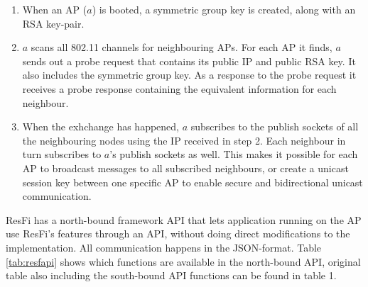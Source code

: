 \begin{enumerate}
	\item When an AP ($a$) is booted, a symmetric group key is created, along with an RSA key-pair. 
	\item $a$ scans all 802.11 channels for neighbouring APs. For each AP it finds, $a$ sends out a probe request that contains its public IP and public RSA key. It also includes
		the symmetric group key. As a response to the probe request it receives a probe response containing the equivalent information for each neighbour. 
	\item When the exhchange has happened, $a$ subscribes to the publish sockets of all the neighbouring nodes using the IP received in step 2. Each neighbour in turn subscribes to $a$'s
		publish sockets as well. This makes it possible for each AP to broadcast messages to all subscribed neighbours,
		or create a unicast session key between one specific AP to enable secure and bidirectional unicast communication.
\end{enumerate}

ResFi has a north-bound framework API that lets application running on the AP use ResFi's features through an API, without doing direct modifications to the implementation. All communication happens
in the JSON-format. Table \ref{tab:resfapi} shows which functions are available in the north-bound API, original table also including the south-bound API functions can be found in \cite{resfi} table 1.

